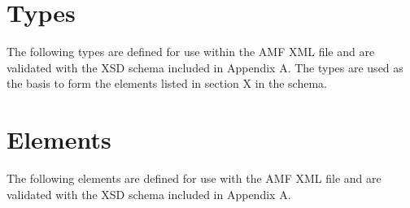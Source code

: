\section{Types}

The following types are defined for use within the AMF XML file and are validated with the XSD schema included in Appendix A.  The types are used as the basis to form the elements listed in section X in the schema.




\newpage
\section{Elements}

The following elements are defined for use with the AMF XML file and are validated with the XSD schema included in Appendix A. 




